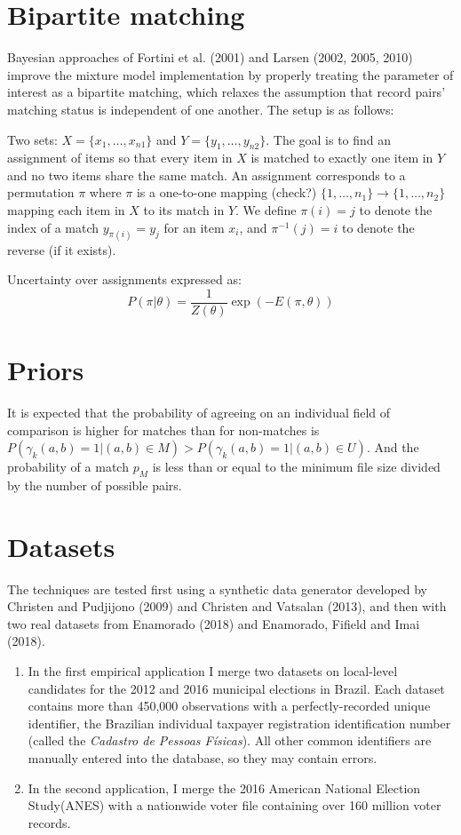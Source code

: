 \documentclass[11pt,reqno]{amsart}
\begin{document}
\section{Bipartite matching}
Bayesian approaches of Fortini et al. (2001) and Larsen (2002, 2005, 2010) improve the mixture model implementation by properly treating the parameter of interest as a bipartite matching, which relaxes the assumption that record pairs' matching status is independent of one another.  The setup is as follows:

Two sets: $X = \{x_1, \dots, x_{n1}\}$ and $Y = \{y_1, \dots, y_{n2}\}$. The goal is to find an assignment of items so that every item in $X$ is matched to exactly one item in $Y$ and no two items share the same match.  An assignment corresponds to a permutation $\pi$ where $\pi$ is a one-to-one mapping (check?) $\{1, \dots, n_1\} \to \{1, \dots, n_2\}$ mapping each item in $X$ to its match in $Y$.  We define $\pi(i) = j$ to denote the index of a match $y_{\pi(i)} = y_j$ for an item $x_i$, and $\pi^{-1}(j) = i$ to denote the reverse (if it exists). 

Uncertainty over assignments expressed as:
\[ P(\pi | \theta)  = \frac{1}{Z(\theta)} \exp(-E(\pi,\theta))\]


\section{Priors} 
It is expected that the probability of agreeing on an individual field of comparison is higher for matches than for non-matches is $P(\gamma_k(a,b) = 1 | (a,b) \in M) > P (\gamma_k(a, b) = 1 | (a,b) \in U) $.  And the probability of a match $p_M$ is less than or equal to the minimum file size divided by the number of possible pairs.  


\section{Datasets}
The techniques are tested first using a synthetic data generator developed by Christen and Pudjijono (2009) and Christen and Vatsalan (2013), and then with two real datasets from Enamorado (2018) and Enamorado, Fifield and Imai (2018). 
\begin{enumerate}
\item In the first empirical application I merge two datasets on local-level candidates for the 2012 and 2016 municipal elections in Brazil.  Each dataset contains more than 450,000 observations with a perfectly-recorded unique identifier, the Brazilian individual taxpayer registration identification number (called the \textit{Cadastro de Pessoas F\'isicas}).  All other common identifiers are manually entered into the database, so they may contain errors.  

\item In the second application, I merge the 2016 American National Election Study(ANES) with a nationwide voter file containing over 160 million voter records.  
\end{enumerate}
\end{document}
